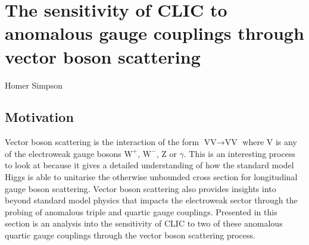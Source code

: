 \chapter{The sensitivity of CLIC to anomalous gauge couplings through vector boson scattering}
\label{chap:PhysicsAnalysis}

%
{Homer Simpson}


\section{Motivation}
Vector boson scattering is the interaction of the form $\text{VV} \rightarrow \text{VV}$ where V is any of the electroweak gauge bosons $\text{W}^{+}$, $\text{W}^{-}$, Z or $\gamma$.  This is an interesting process to look at because it gives a detailed understanding of how the standard model Higgs is able to unitarise the otherwise unbounded cross section for longitudinal gauge boson scattering.  Vector boson scattering also provides insights into beyond standard model physics that impacts the electroweak sector through the probing of anomalous triple and quartic gauge couplings.  Presented in this section is an analysis into the sensitivity of CLIC to two of these anomalous quartic gauge couplings through the vector boson scattering process.

